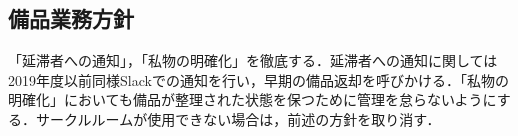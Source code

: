 \subsection*{備品業務方針}

「延滞者への通知」，「私物の明確化」を徹底する．延滞者への通知に関しては2019年度以前同様Slackでの通知を行い，早期の備品返却を呼びかける．「私物の明確化」においても備品が整理された状態を保つために管理を怠らないようにする．サークルルームが使用できない場合は，前述の方針を取り消す．
